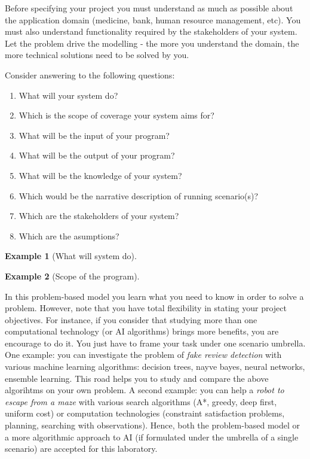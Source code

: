 \documentclass[a4paper,12pt]{report}
\newtheorem{example}{Example}
\begin{document}
Before specifying your project you must understand as much as possible about the application domain (medicine, bank, human resource management, etc). 
You must also understand functionality required by the stakeholders of your system. 
Let the problem drive the modelling - the more you understand the domain, the more technical solutions need to be solved by you. 

Consider answering to the following questions:
\begin{enumerate}
 \item What will your system do?
\item Which is the scope of coverage your system aims for?
\item What will be the input of your program?
\item What will be the output of your program?
\item What will be the knowledge of your system?
\item Which would be the narrative description of running scenario(s)?
\item Which are the stakeholders of your system?
\item Which are the asumptions?
\end{enumerate}

\begin{example}[What will system do]
 
\end{example}

\begin{example}[Scope of the program]
 
\end{example}

In this problem-based model you learn what you 
need to know in order to solve a problem. 
However, note that you have total flexibility in stating your project objectives.
For instance, if you consider that studying more 
than one computational technology (or AI algorithms) brings more benefits, 
you are encourage to do it. 
You just have to frame your task under one scenario umbrella. 
One example: you can investigate the problem of {\it fake review detection} with 
various machine learning algorithms: decision trees, nayve bayes, neural networks, ensemble learning. 
This road helps you to study and compare the above algorihtms on your own problem.
A second example: you can help a {\it robot to escape from a maze} 
with various search algorithms (A*, greedy, deep first, uniform cost) 
or computation technologies (constraint satisfaction problems, planning, 
searching with observations).
Hence, both the problem-based model or a more algorithmic approach to AI 
(if formulated under the umbrella of a single scenario) 
are accepted for this laboratory.
\end{document}

